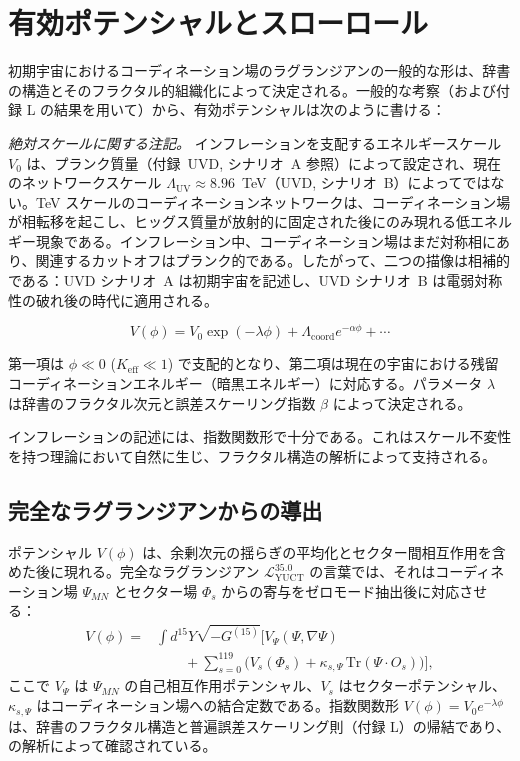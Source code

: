 \documentclass[11pt,a4paper]{article}
\newcommand{\Keff}{K_{\mathrm{eff}}}
\begin{document}
	\section{有効ポテンシャルとスローロール}
	\label{sec:potential}
	
	初期宇宙におけるコーディネーション場のラグランジアンの一般的な形は、辞書の構造とそのフラクタル的組織化によって決定される。一般的な考察（および付録 L の結果を用いて）から、有効ポテンシャルは次のように書ける：
	
	\noindent\textit{絶対スケールに関する注記。}
	インフレーションを支配するエネルギースケール \(V_0\) は、プランク質量（付録~UVD, シナリオ~A 参照）によって設定され、現在のネットワークスケール \(\Lambda_{\mathrm{UV}} \approx 8.96\)~TeV（UVD, シナリオ~B）によってではない。TeV スケールのコーディネーションネットワークは、コーディネーション場が相転移を起こし、ヒッグス質量が放射的に固定された後にのみ現れる低エネルギー現象である。インフレーション中、コーディネーション場はまだ対称相にあり、関連するカットオフはプランク的である。したがって、二つの描像は相補的である：UVD シナリオ~A は初期宇宙を記述し、UVD シナリオ~B は電弱対称性の破れ後の時代に適用される。
	
	\begin{equation}
		V(\phi) = V_0 \exp\left( -\lambda \phi \right) + \Lambda_{\mathrm{coord}} e^{-\alpha \phi} + \cdots
		\label{eq:potential}
	\end{equation}
	
	第一項は \(\phi \ll 0\) (\(\Keff \ll 1\)) で支配的となり、第二項は現在の宇宙における残留コーディネーションエネルギー（暗黒エネルギー）に対応する。パラメータ \(\lambda\) は辞書のフラクタル次元と誤差スケーリング指数 \(\beta\) によって決定される。
	
	インフレーションの記述には、指数関数形で十分である。これはスケール不変性を持つ理論において自然に生じ、フラクタル構造の解析によって支持される。
	
	\subsection{完全なラグランジアンからの導出}
	
	ポテンシャル \(V(\phi)\) は、余剰次元の揺らぎの平均化とセクター間相互作用を含めた後に現れる。完全なラグランジアン \(\mathcal{L}_{\text{YUCT}}^{35.0}\) の言葉では、それはコーディネーション場 \(\Psi_{MN}\) とセクター場 \(\Phi_s\) からの寄与をゼロモード抽出後に対応させる：
	\begin{align}
		V(\phi) = &\int d^{15}Y \sqrt{-G^{(15)}} \Big[ V_{\Psi}(\Psi,\nabla\Psi) \nonumber\\
		&\qquad + \sum_{s=0}^{119} \big( V_s(\Phi_s) + \kappa_{s,\Psi}\,\mathrm{Tr}(\Psi\cdot O_s) \big) \Big],
	\end{align}
	ここで \(V_{\Psi}\) は \(\Psi_{MN}\) の自己相互作用ポテンシャル、\(V_s\) はセクターポテンシャル、\(\kappa_{s,\Psi}\) はコーディネーション場への結合定数である。指数関数形 \(V(\phi)=V_0 e^{-\lambda\phi}\) は、辞書のフラクタル構造と普遍誤差スケーリング則（付録 L）の帰結であり、\cite{Yakushev2026} の解析によって確認されている。
	
\end{document}
